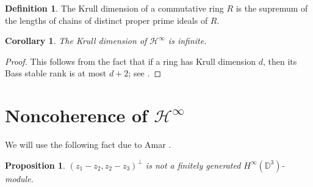 \documentclass[11pt,reqno]{amsart}
\numberwithin{equation}{section}
\newtheorem{corollary}[theorem]{Corollary}
\newtheorem{proposition}[theorem]{Proposition}
\theoremstyle{definition}
\theoremstyle{definition}
\newtheorem{definition}[theorem]{Definition}
\theoremstyle{definition}
\begin{document}
\begin{definition}
  The Krull dimension of a commutative ring $R$ is the supremum of the
  lengths of chains of distinct proper prime ideals of $R$.
\end{definition}

\begin{corollary}
  The Krull dimension of ${{{\mathscr{H}}^{\infty}}}$ is infinite. 
\end{corollary}
\begin{proof} This follows from the fact that if a ring has Krull
  dimension $d$, then its Bass stable rank is at most $d+2$; see
  \cite{Hei}.
\end{proof}
 
\section{Noncoherence of ${{{\mathscr{H}}^{\infty}}}$}

We will use the following fact due to Amar \cite[Proof of
Theorem~1.(ii)]{Ama}.

\begin{proposition}
\label{prop_Amar}
$(z_1-z_2,z_2-z_3)^\perp$ is not a finitely generated
$H^\infty({\mathbb{D}}^3)$-module.
\end{proposition}
\end{document}
